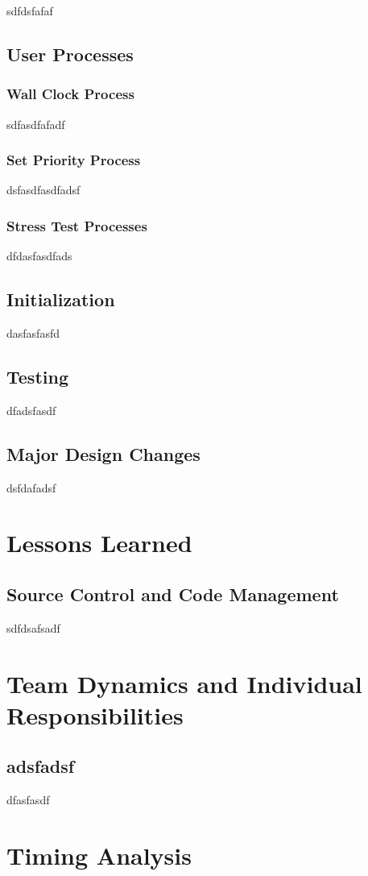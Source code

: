 \documentclass[12pt]{report}
\begin{document}
sdfdsfafaf


\section{User Processes}

\subsection{Wall Clock Process}

sdfasdfafadf

\subsection{Set Priority Process}

dsfasdfasdfadsf

\subsection{Stress Test Processes}

dfdasfasdfads

\section{Initialization}

dasfasfasfd

\section{Testing}

dfadsfasdf

\section{Major Design Changes}

dsfdafadsf

\chapter{Lessons Learned}

\section{Source Control and Code Management}

sdfdsafsadf

\chapter{Team Dynamics and Individual Responsibilities}

\section{adsfadsf}

dfasfasdf

\chapter{Timing Analysis}
\end{document}
